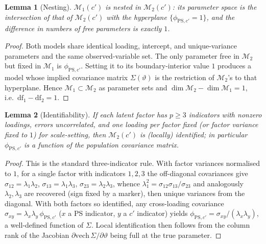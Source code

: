 \documentclass{amsart}
\newtheorem{lemma}{Lemma}
\theoremstyle{remark}
\begin{document}
\begin{lemma}[Nesting]\label{lem:nest}
$\mathcal M_1(c')$ is nested in $\mathcal M_2(c')$: its parameter space is the
intersection of that of $\mathcal M_2(c')$ with the hyperplane
$\{\phi_{\mathrm{PS},c'}=1\}$, and the difference in numbers of free parameters is
exactly $1$.
\end{lemma}
\begin{proof}
Both models share identical loading, intercept, and unique-variance parameters and
the same observed-variable set. The only parameter free in $\mathcal M_2$ but fixed
in $\mathcal M_1$ is $\phi_{\mathrm{PS},c'}$. Setting it to its boundary-interior
value $1$ produces a model whose implied covariance matrix
$\Sigma(\vartheta)$ is the restriction of $\mathcal M_2$'s to that hyperplane.
Hence $\mathcal M_1\subset\mathcal M_2$ as parameter sets and
$\dim\mathcal M_2-\dim\mathcal M_1=1$, i.e.\ $\mathrm{df}_1-\mathrm{df}_2=1$. \end{proof}

\begin{lemma}[Identifiability]\label{lem:ident}
If each latent factor has $p\ge 3$ indicators with nonzero loadings, errors
uncorrelated, and one loading per factor fixed (or factor variance fixed to $1$)
for scale-setting, then $\mathcal M_2(c')$ is (locally) identified; in particular
$\phi_{\mathrm{PS},c'}$ is a function of the population covariance matrix.
\end{lemma}
\begin{proof}
This is the standard three-indicator rule. With factor variances normalised to
$1$, for a single factor with indicators $1,2,3$ the off-diagonal covariances give
$\sigma_{12}=\lambda_1\lambda_2$, $\sigma_{13}=\lambda_1\lambda_3$,
$\sigma_{23}=\lambda_2\lambda_3$, whence
$\lambda_1^2=\sigma_{12}\sigma_{13}/\sigma_{23}$ and analogously $\lambda_2,\lambda_3$
are recovered (sign fixed by a marker), then unique variances from the diagonal.
With both factors so identified, any cross-loading covariance
$\sigma_{x y}=\lambda_x\lambda_y\,\phi_{\mathrm{PS},c'}$ ($x$ a PS indicator, $y$ a
$c'$ indicator) yields $\phi_{\mathrm{PS},c'}=\sigma_{xy}/(\lambda_x\lambda_y)$, a
well-defined function of $\Sigma$. Local identification then follows from the
column rank of the Jacobian $\partial\mathrm{vech}\,\Sigma/\partial\vartheta$ being
full at the true parameter. \end{proof}
\end{document}
